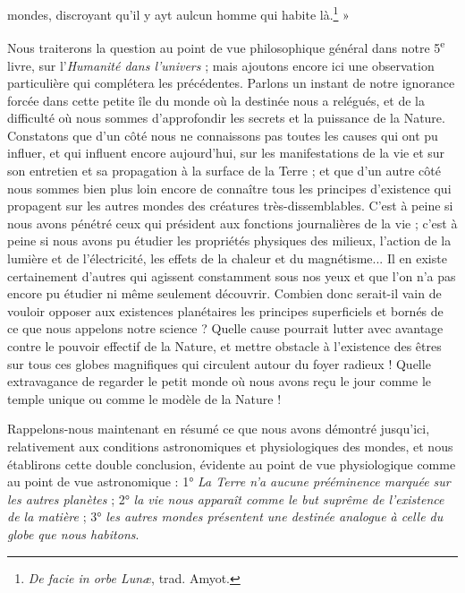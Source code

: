 \documentclass[a4paper, 11pt, oneside]{article}
\begin{document}
mondes, discroyant qu'il y ayt aulcun homme qui habite là.\footnote{\emph{De facie in orbe Lunæ}, trad. Amyot.} »

Nous traiterons la question au point de vue philosophique général dans notre 5\textsuperscript{e} livre, sur l'\emph{Humanité dans l'univers} ; mais ajoutons encore ici une observation particulière qui complétera les précédentes. Parlons un instant de notre ignorance forcée dans cette petite île du monde où la destinée nous a relégués, et de la difficulté où nous sommes d'approfondir les secrets et la puissance de la Nature. Constatons que d'un côté nous ne connaissons pas toutes les causes qui ont pu influer, et qui influent encore aujourd'hui, sur les manifestations de la vie et sur son entretien et sa propagation à la surface de la Terre ; et que d'un autre côté nous sommes bien plus loin encore de connaître tous les principes d'existence qui propagent sur les autres mondes des créatures très-dissemblables. C'est à peine si nous avons pénétré ceux qui président aux fonctions journalières de la vie ; c'est à peine si nous avons pu étudier les propriétés physiques des milieux, l'action de la lumière et de l'électricité, les effets de la chaleur et du magnétisme... Il en existe certainement d'autres qui agissent constamment sous nos yeux et que l'on n'a pas encore pu étudier ni même seulement découvrir. Combien donc serait-il vain de vouloir opposer aux existences planétaires les principes superficiels et bornés de ce que nous appelons notre science ? Quelle cause pourrait lutter avec avantage contre le pouvoir effectif de la Nature, et mettre obstacle à l'existence des êtres sur tous ces globes magnifiques qui circulent autour du foyer radieux ! Quelle extravagance de regarder le petit monde où nous avons reçu le jour comme le temple unique ou comme le modèle de la Nature !

Rappelons-nous maintenant en résumé ce que nous avons démontré jusqu'ici, relativement aux conditions astronomiques et physiologiques des mondes, et nous établirons cette double conclusion, évidente au point de vue physiologique comme au point de vue astronomique : 1° \emph{La Terre n'a aucune prééminence marquée sur les autres planètes} ; 2° \emph{la vie nous apparaît comme le but suprême de l'existence de la matière} ; 3° \emph{les autres mondes présentent une destinée analogue à celle du globe que nous habitons}.
\end{document}
